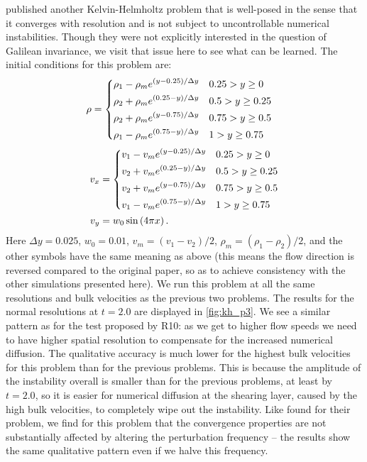\documentclass[12pt]{article}
\begin{document}
\citet{mcnally:2012} published another Kelvin-Helmholtz problem that 
is well-posed in the sense that it converges with resolution and 
is not subject to uncontrollable numerical instabilities. Though they 
were not explicitly interested in the question of Galilean invariance, 
we visit that issue here to see what can be learned. The initial 
conditions for this problem are:
\begin{align}
  \rho &= \begin{dcases} \rho_1 - \rho_m e^{(y-0.25)/\Delta y} & 0.25 > y \geq 0 \\ 
                         \rho_2 + \rho_m e^{(0.25-y)/\Delta y} & 0.5 > y \geq 0.25 \\
                         \rho_2 + \rho_m e^{(y-0.75)/\Delta y} & 0.75 > y \geq 0.5 \\
                         \rho_1 - \rho_m e^{(0.75-y)/\Delta y} & 1 > y \geq 0.75 \end{dcases} \label{eq:kh_p3_rho}
\end{align}
\begin{align}
  v_x &= \begin{dcases} v_1 - v_m e^{(y-0.25)/\Delta y} & 0.25 > y \geq 0 \\
                        v_2 + v_m e^{(0.25-y)/\Delta y} & 0.5 > y \geq 0.25 \\
                        v_2 + v_m e^{(y-0.75)/\Delta y} & 0.75 > y \geq 0.5 \\
                        v_1 - v_m e^{(0.75-y)/\Delta y} & 1 > y \geq 0.75 \end{dcases} \label{eq:kh_p3_vx} \\
  v_y &= w_0\, \text{sin}\left(4\pi x\right). \label{eq:kh_p3_vy}
\end{align}
Here $\Delta y = 0.025$, $w_0 = 0.01$, $v_m = (v_1 - v_2) / 2$, $\rho_m = (\rho_1 - \rho_2) / 2$, 
and the other symbols have the same meaning as above (this means the flow direction
is reversed compared to the original paper, so as to achieve consistency with the 
other simulations presented here). We run this problem at all the same resolutions 
and bulk velocities as the previous two problems. The results for the normal resolutions 
at $t = 2.0$ are displayed in \autoref{fig:kh_p3}. We see a similar pattern as for 
the test proposed by R10: as we get to higher flow speeds we need to have higher 
spatial resolution to compensate for the increased numerical diffusion. The 
qualitative accuracy is much lower for the highest bulk velocities for this problem
than for the previous problems. This is because the amplitude of the instability overall
is smaller than for the previous problems, at least by $t = 2.0$, so it is easier
for numerical diffusion at the shearing layer, caused by the high bulk velocities,
to completely wipe out the instability. Like \citet{robertson:2010} found for
their problem, we find for this problem that the convergence properties are not
substantially affected by altering the perturbation frequency -- the results
show the same qualitative pattern even if we halve this frequency.
\end{document}
